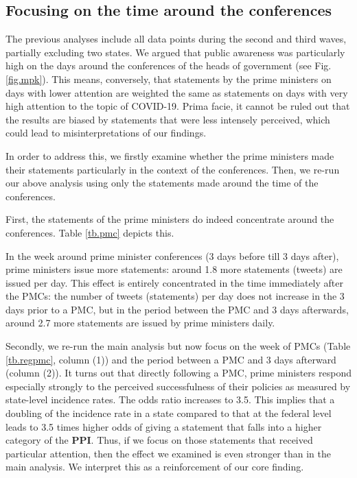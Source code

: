 \documentclass[12pt, abstracton]{scrartcl}
\begin{document}
\subsection{Focusing on the time around the conferences}
The previous analyses include all data points during the second and third waves, partially excluding two states. We argued that public awareness was particularly high on the days around the conferences of the heads of government (see Fig. \ref{fig.mpk}). This means, conversely, that statements by the prime ministers on days with lower attention are weighted the same as statements on days with very high attention to the topic of COVID-19. Prima facie, it cannot be ruled out that the results are biased by statements that were less intensely perceived, which could lead to misinterpretations of our findings.



In order to address this, we firstly examine whether the prime ministers made their statements particularly in the context of the conferences. Then, we re-run our above analysis using only the statements made around the time of the conferences.

First, the statements of the prime ministers do indeed concentrate around the conferences. Table \ref{tb.pmc} depicts this.
	
In the week around prime minister conferences (3 days before till 3 days after), prime ministers issue more statements: around 1.8 more statements (tweets) are issued per day. This effect is entirely concentrated in the time immediately after the PMCs: the number of tweets (statements) per day does not increase in the 3 days prior to a PMC, but in the period between the PMC and 3 days afterwards, around 2.7 more statements are issued by prime ministers daily.



Secondly, we re-run the main analysis but now focus on the week of PMCs (Table \ref{tb.regpmc}, column (1)) and the period between a PMC and 3 days afterward (column (2)). It turns out that directly following a PMC, prime ministers respond especially strongly to the perceived successfulness of their policies as measured by state-level incidence rates. The odds ratio increases to 3.5. This implies that a doubling of the incidence rate in a state compared to that at the federal level leads to 3.5 times higher odds of giving a statement that falls into a higher category of the \textbf{PPI}. Thus, if we focus on those statements that received particular attention, then the effect we examined is even stronger than in the main analysis. We interpret this as a reinforcement of our core finding.
\end{document}
